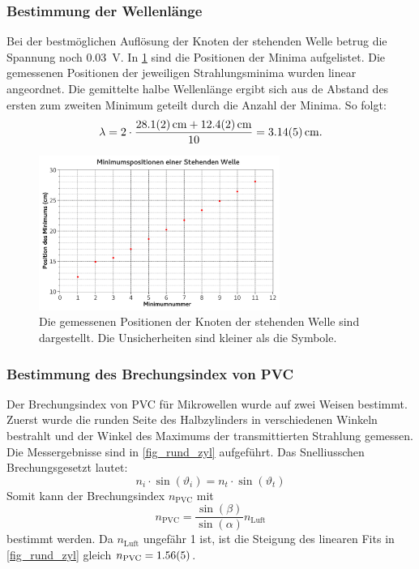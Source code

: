 \documentclass[
	a4paper,
	12pt,
	pagesize,
	ngerman
]{scrartcl}
\begin{document}
	\subsubsection{Bestimmung der Wellenlänge}
	Bei der bestmöglichen Auflösung der Knoten der stehenden Welle betrug die Spannung noch \SI{0,03}{V}. In \cref{fig_steh_welle} sind die Positionen der Minima aufgelistet.
	Die gemessenen Positionen der jeweiligen Strahlungsminima wurden linear angeordnet. 
	Die gemittelte halbe Wellenlänge ergibt sich aus de Abstand des ersten zum zweiten Minimum geteilt durch die Anzahl der Minima. 
	So folgt: 
	\begin{equation}
		\lambda = 2 \cdot \frac{\SI{28,1 +- 0,2}{cm} + \SI{12,4+-0,2}{cm}}{10} = \SI{3,14 +- 0,05}{cm}.
	\end{equation}
	\begin{figure}[H]
		\includegraphics[width=0.7\textwidth]{fig_steh_welle}
		\centering
		\caption{Die gemessenen Positionen der Knoten der stehenden Welle sind dargestellt. Die Unsicherheiten sind kleiner als die Symbole.}
		\label{fig_steh_welle}
		\centering
	\end{figure}
	\subsubsection{Bestimmung des Brechungsindex von PVC}
	Der Brechungsindex von PVC für Mikrowellen wurde auf zwei Weisen bestimmt. 
	Zuerst wurde die runden Seite des Halbzylinders in verschiedenen Winkeln bestrahlt und der Winkel des Maximums der transmittierten Strahlung gemessen.
	Die Messergebnisse sind in \cref{fig_rund_zyl} aufgeführt.
	Das Snelliusschen Brechungsgesetzt lautet:
	\begin{equation}
		n_i \cdot \sin(\vartheta_i) = n_t \cdot \sin(\vartheta_t)
		\label{eq_snellius}
	\end{equation}
	Somit kann der Brechungsindex $n_\text{PVC}$  mit 
	\begin{equation}
		n_\text{PVC} = \frac{\sin(\beta)}{\sin(\alpha)} n_\text{Luft}
	\end{equation}
	bestimmt werden.
	Da $n_\text{Luft}$ ungefähr 1 ist, ist die Steigung des linearen Fits in \cref{fig_rund_zyl} gleich $n_\text{PVC}=\SI{1,56 +- 0,05}{}$.
\end{document}
